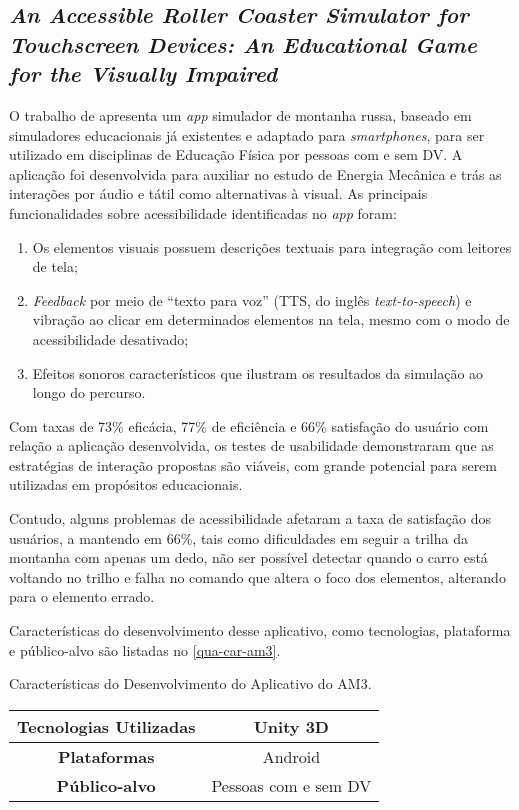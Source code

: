 \subsection{\emph{An Accessible Roller Coaster Simulator for Touchscreen Devices: An Educational Game for the Visually Impaired}}

O trabalho de  apresenta um \emph{app} simulador de montanha russa, baseado em simuladores educacionais já existentes
e adaptado para \emph{smartphones}, para ser utilizado em disciplinas de Educação Física por pessoas com e sem DV\@.
A aplicação foi desenvolvida para auxiliar no estudo de Energia Mecânica e trás as interações por áudio e tátil como alternativas à visual.
As principais funcionalidades sobre acessibilidade identificadas no \emph{app} foram:

\begin{enumerate}
  \item Os elementos visuais possuem descrições textuais para integração com leitores de tela;
  \item \emph{Feedback} por meio de ``texto para voz'' (TTS, do inglês \emph{text-to-speech}) e vibração ao clicar em determinados elementos
        na tela, mesmo com o modo de acessibilidade desativado;
  \item Efeitos sonoros característicos que ilustram os resultados da simulação ao longo do percurso.
\end{enumerate}

Com taxas de 73\% eficácia, 77\% de eficiência e 66\% satisfação do usuário com relação a aplicação desenvolvida, os testes de usabilidade
demonstraram que as estratégias de interação propostas são viáveis, com grande potencial para serem utilizadas em propósitos educacionais.

Contudo, alguns problemas de acessibilidade afetaram a taxa de satisfação dos usuários, a mantendo em 66\%, tais como
dificuldades em seguir a trilha da montanha com apenas um dedo, não ser possível detectar quando o carro está voltando
no trilho e falha no comando que altera o foco dos elementos, alterando para o elemento errado.

Características do desenvolvimento desse aplicativo, como tecnologias, plataforma e público-alvo são listadas
no \autoref{qua-car-am3}.

\begin{quadro}[htb!]
  \caption{\label{qua-car-am3}Características do Desenvolvimento do Aplicativo do AM3.}
  \begin{tabular}{|c|c|}
    \hline
    \textbf{Tecnologias Utilizadas} & Unity 3D             \\ \hline
    \textbf{Plataformas}            & Android              \\ \hline
    \textbf{Público-alvo}           & Pessoas com e sem DV \\
    \hline
  \end{tabular}
\end{quadro}

